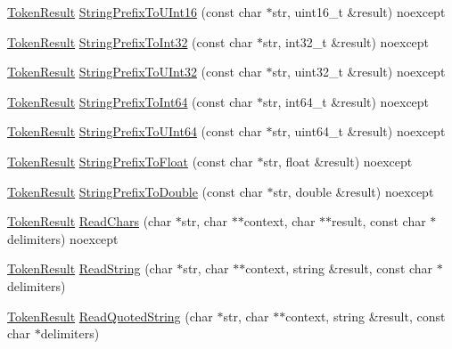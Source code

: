\begin{DoxyCompactItemize}
\item 
\hyperlink{namespacemage_a2178ba2411db5912f41b2e7698c2037d}{Token\+Result} \hyperlink{namespacemage_a4933d7655015917cc797f5453ef844be}{String\+Prefix\+To\+U\+Int16} (const char $\ast$str, uint16\+\_\+t \&result) noexcept
\item 
\hyperlink{namespacemage_a2178ba2411db5912f41b2e7698c2037d}{Token\+Result} \hyperlink{namespacemage_a0041beacf2673190ec47c8155e98d729}{String\+Prefix\+To\+Int32} (const char $\ast$str, int32\+\_\+t \&result) noexcept
\item 
\hyperlink{namespacemage_a2178ba2411db5912f41b2e7698c2037d}{Token\+Result} \hyperlink{namespacemage_a179f9ed7d4414f793afb3fd395e556e8}{String\+Prefix\+To\+U\+Int32} (const char $\ast$str, uint32\+\_\+t \&result) noexcept
\item 
\hyperlink{namespacemage_a2178ba2411db5912f41b2e7698c2037d}{Token\+Result} \hyperlink{namespacemage_a06413255d20a64e3fef915c58f411e96}{String\+Prefix\+To\+Int64} (const char $\ast$str, int64\+\_\+t \&result) noexcept
\item 
\hyperlink{namespacemage_a2178ba2411db5912f41b2e7698c2037d}{Token\+Result} \hyperlink{namespacemage_a9a085a5cae45c45ad426b624db0d8105}{String\+Prefix\+To\+U\+Int64} (const char $\ast$str, uint64\+\_\+t \&result) noexcept
\item 
\hyperlink{namespacemage_a2178ba2411db5912f41b2e7698c2037d}{Token\+Result} \hyperlink{namespacemage_a7a97aa7d133aeae74afe9c64b8c0bb85}{String\+Prefix\+To\+Float} (const char $\ast$str, float \&result) noexcept
\item 
\hyperlink{namespacemage_a2178ba2411db5912f41b2e7698c2037d}{Token\+Result} \hyperlink{namespacemage_a3006589f624e0c0d4f7747679b30027d}{String\+Prefix\+To\+Double} (const char $\ast$str, double \&result) noexcept
\item 
\hyperlink{namespacemage_a2178ba2411db5912f41b2e7698c2037d}{Token\+Result} \hyperlink{namespacemage_affff1d5132c3c823d65799d6458110f1}{Read\+Chars} (char $\ast$str, char $\ast$$\ast$context, char $\ast$$\ast$result, const char $\ast$delimiters) noexcept
\item 
\hyperlink{namespacemage_a2178ba2411db5912f41b2e7698c2037d}{Token\+Result} \hyperlink{namespacemage_aa4f9ae6b6aa815ab879d4ea1f0453172}{Read\+String} (char $\ast$str, char $\ast$$\ast$context, string \&result, const char $\ast$delimiters)
\item 
\hyperlink{namespacemage_a2178ba2411db5912f41b2e7698c2037d}{Token\+Result} \hyperlink{namespacemage_a0d98db3ab52b137bc811727c68659329}{Read\+Quoted\+String} (char $\ast$str, char $\ast$$\ast$context, string \&result, const char $\ast$delimiters)

\end{DoxyCompactItemize}
